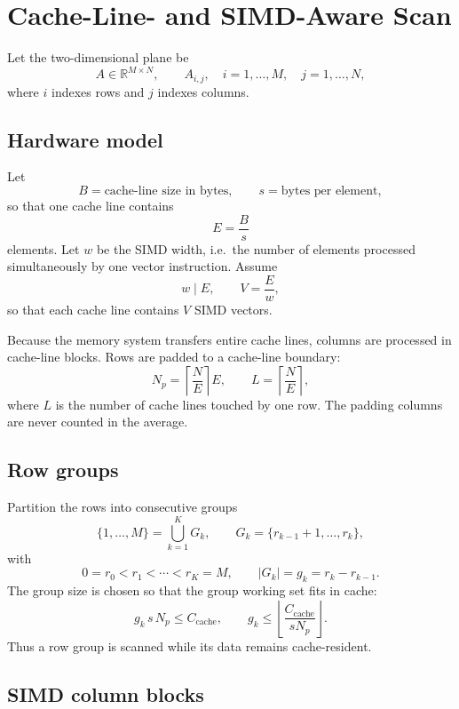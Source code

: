 \documentclass{article}
\begin{document}
\section*{Cache-Line- and SIMD-Aware Scan}

Let the two-dimensional plane be
\[
  A \in \mathbb{R}^{M\times N},
  \qquad A_{i,j},\quad i=1,\dots,M,\quad j=1,\dots,N,
\]
where \(i\) indexes rows and \(j\) indexes columns.

\subsection*{Hardware model}

Let
\[
  B = \text{cache-line size in bytes},\qquad
  s = \text{bytes per element},
\]
so that one cache line contains
\[
  E = \frac{B}{s}
\]
elements.  Let \(w\) be the SIMD width, i.e.\ the number of elements processed
simultaneously by one vector instruction.  Assume
\[
  w \mid E,
  \qquad
  V = \frac{E}{w},
\]
so that each cache line contains \(V\) SIMD vectors.

Because the memory system transfers entire cache lines, columns are processed
in cache-line blocks.  Rows are padded to a cache-line boundary:
\[
  N_p = \left\lceil \frac{N}{E}\right\rceil E,
  \qquad
  L = \left\lceil \frac{N}{E}\right\rceil,
\]
where \(L\) is the number of cache lines touched by one row.  The padding
columns are never counted in the average.

\subsection*{Row groups}

Partition the rows into consecutive groups
\[
  \{1,\dots,M\} = \bigcup_{k=1}^{K} G_k,
  \qquad
  G_k = \{r_{k-1}+1,\dots,r_k\},
\]
with
\[
  0=r_0<r_1<\cdots<r_K=M,
  \qquad
  |G_k|=g_k=r_k-r_{k-1}.
\]
The group size is chosen so that the group working set fits in cache:
\[
  g_k\,s\,N_p \le C_{\mathrm{cache}},
  \qquad
  g_k\le \left\lfloor \frac{C_{\mathrm{cache}}}{sN_p}\right\rfloor .
\]
Thus a row group is scanned while its data remains cache-resident.

\subsection*{SIMD column blocks}
\end{document}
